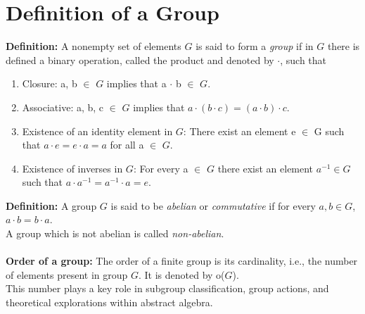 \section{Definition of a Group}
\textbf{Definition:} 
    A nonempty set of elements \(G\) is said to form a \textit{group} if in \(G\) there is defined a binary operation, called the product and denoted by $\cdot$, such that
    \begin{enumerate}
      \item Closure: a, b $\in$ \(G\) implies that a $\cdot$ b $\in$ \(G\). 
      \item Associative: a, b, c $\in$ \(G\) implies that $a\cdot(b\cdot c)=(a\cdot b)\cdot c$.
      \item Existence of an identity element in \(G\): There exist an element e $\in$ G such that $a\cdot e = e\cdot a = a$ for all a $\in$ \(G\).
      \item Existence of inverses in \(G\): For every a $\in$ \(G\) there exist an element $a^{-1} \in G$ such that $a \cdot a^{-1} = a^{-1} \cdot a = e$.\\
    \end{enumerate}
\textbf{Definition:} 
A group \(G\) is said to be \textit{abelian} or \textit{commutative} if for every \(a, b \in G\), \(a \cdot b = b \cdot a\).\\
A group which is not abelian is called \textit{non-abelian}.\\\\
\textbf{Order of a group:}
The order of a finite group is its cardinality, i.e., the number of elements present in group \(G\). It is denoted by o(\(G\)). \\This number plays a key role in subgroup classification, group actions, and theoretical explorations within abstract algebra.

